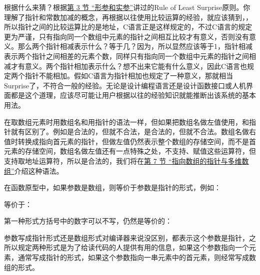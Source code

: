 根据什么来猜？根据\hyperlink{db.ch03s03.id2713785}{第 3 节 “形参和实参”}讲过的Rule of Least Surprise原则。你理解了指针和常数加减的概念，再根据以往使用比较运算的经验，就应该猜到，，所以指针之间的比较运算比的是地址，C语言正是这样规定的，不过C语言的规定更为严谨，只有指向同一个数组中元素的指针之间相互比较才有意义，否则没有意义。那么两个指针相减表示什么？等于几？因为，所以显然应该等于1，指针相减表示两个指针之间相差的元素个数，同样只有指向同一个数组中元素的指针之间相减才有意义。两个指针相加表示什么？想不出来它能有什么意义，因此C语言也规定两个指针不能相加。假如C语言为指针相加也规定了一种意义，那就相当Surprise了，不符合一般的经验。无论是设计编程语言还是设计函数接口或人机界面都是这个道理，应该尽可能让用户根据以往的经验知识就能推断出该系统的基本用法。



在取数组元素时用数组名和用指针的语法一样，但如果把数组名做左值使用，和指针就有区别了。例如是合法的，但就不合法，是合法的，但就不合法。数组名做右值时转换成指向首元素的指针，但做左值仍然表示整个数组的存储空间，而不是首元素的存储空间，数组名做左值还有一点特殊之处，不支持\BookCode{+\BookSplit{}+\BookSplit{}}、赋值这些运算符，但支持取地址运算符\BookCode{\&}，所以是合法的，我们将在\hyperlink{db.ch23s07.id2813032}{第 7 节 “指向数组的指针与多维数组”}介绍这种语法。



在函数原型中，如果参数是数组，则等价于参数是指针的形式，例如：




等价于：




第一种形式方括号中的数字可以不写，仍然是等价的：




参数写成指针形式还是数组形式对编译器来说没区别，都表示这个参数是指针，之所以规定两种形式是为了给读代码的人提供有用的信息，如果这个参数指向一个元素，通常写成指针的形式，如果这个参数指向一串元素中的首元素，则经常写成数组的形式。




